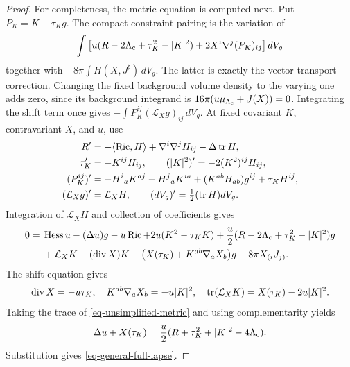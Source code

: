 \begin{proof}
For completeness, the metric equation is computed next.  Put
\(P_K=K-\tau_Kg\).  The compact constraint pairing is the variation of
\[
 \int\big[u(R-2\Lambda_{\rm c}+\tau_K^2-|K|^2)
                  +2X^i\nabla^j(P_K)_{ij}\big]\,dV_g
\]
together with
\(-8\pi\int H(X,J^\sharp)\,dV_g\).
The latter is exactly the vector-transport correction.
Changing the fixed background volume density to the varying one
adds zero, since its background integrand is
\(16\pi(u\mu_{\Lambda_{\rm c}}+J(X))=0\).
Integrating the shift term once gives
\(-\int P_K^{ij}(\mathcal L_Xg)_{ij}\,dV_g\).
At fixed covariant \(K\), contravariant \(X\), and \(u\), use
\[
 \begin{split}
 R'&=-\langle\operatorname{Ric},H\rangle+\nabla^i\nabla^jH_{ij}
                                  -\Delta\operatorname{tr} H,\\
 \tau_K'&=-K^{ij}H_{ij},\qquad
 (|K|^2)'=-2(K^2)^{ij}H_{ij},\\
 (P_K^{ij})'&=-H^i{}_aK^{aj}-H^j{}_aK^{ia}
                    +(K^{ab}H_{ab})g^{ij}+\tau_KH^{ij},\\
 (\mathcal L_Xg)'&=\mathcal L_XH,\qquad
 (dV_g)'=\tfrac12(\operatorname{tr} H)dV_g.
 \end{split}
 \]
Integration of \(\mathcal L_XH\) and collection of coefficients gives
\begin{align}
 0={}&\operatorname{Hess} u-(\Delta u)g-u\operatorname{Ric}+2u(K^2-\tau_KK)
      +\frac u2(R-2\Lambda_{\rm c}+\tau_K^2-|K|^2)g \notag\\
 &+\mathcal L_XK-(\operatorname{div}X)K
       -\big(X(\tau_K)+K^{ab}\nabla_aX_b\big)g
       -8\pi X_{(i}J_{j)}.
 \label{eq-unsimplified-metric}
\end{align}
The shift equation gives
\[
 \operatorname{div}X=-u\tau_K,\quad
 K^{ab}\nabla_aX_b=-u|K|^2,\quad
 \operatorname{tr}(\mathcal L_XK)=X(\tau_K)-2u|K|^2.
\]
Taking the trace of \eqref{eq-unsimplified-metric} and using
complementarity yields
\begin{equation}
 \Delta u+X(\tau_K)
   =\frac u2(R+\tau_K^2+|K|^2-4\Lambda_{\rm c}).
 \label{eq-trace-identity}
\end{equation}
Substitution gives \eqref{eq-general-full-lapse}.


\end{proof}
